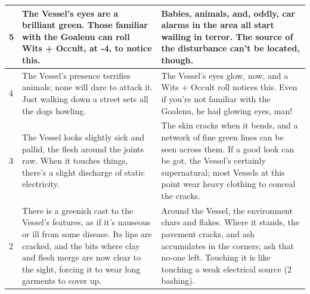 \begin{table}[H]
\begin{tabularx}{\textwidth}{|l|X|X|}
        5          & The Vessel's eyes are a brilliant green. Those familiar with the Goalenu can roll Wits + Occult, at -4, to notice this.                                                                                                                                                                                      & Babies, animals, and, oddly, car alarms in the area all start wailing in terror. The source of the disturbance can't be located, though.                                                                                                                                                                                             \\ \hline
        4          & The Vessel's presence terrifies animals; none will dare to attack it. Just walking down a street sets all the dogs howling.                                                                                                                                                                                  & The Vessel's eyes glow, now, and a Wits + Occult roll notices this. Even if you're not familiar with the Goalenu, he had glowing eyes, man!                                                                                                                                                                                          \\ \hline
        3          & The Vessel looks slightly sick and pallid, the flesh around the joints raw. When it touches things, there's a slight discharge of static electricity.                                                                                                                                                        & The skin cracks when it bends, and a network of fine green lines can be seen across them. If a good look can be got, the Vessel's certainly supernatural; most Vessels at this point wear heavy clothing to conceal the cracks.                                                                                                      \\ \hline
        2          & There is a greenish cast to the Vessel's features, as if it's nauseous or ill from some disease. Its lips are cracked, and the bits where clay and flesh merge are now clear to the sight, forcing it to wear long garments to cover up.                                                                     & Around the Vessel, the environment chars and flakes. Where it stands, the pavement cracks, and ash accumulates in the corners; ash that no-one left. Touching it is like touching a weak electrical source (2 bashing).                                                                                                              \\ \hline

\end{tabularx}
\end{table}
